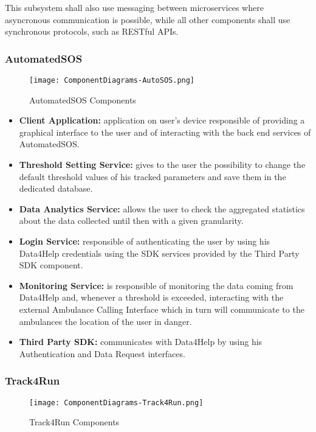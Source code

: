 This subsystem shall also use messaging between microservices where asyncronous communication is possible, while all other components shall use synchronous protocols, such as RESTful APIs.

\subsubsection{AutomatedSOS}

\FloatBarrier
\begin{figure}[!h]
	\centering
	\texttt{[image: ComponentDiagrams-AutoSOS.png]}
	\caption{AutomatedSOS Components}
\end{figure}
\FloatBarrier

\begin{itemize}
	\item \textbf{Client Application:} application on user's device responsible of providing a graphical interface to the user and of interacting with the back end  services of AutomatedSOS.
	\item \textbf{Threshold Setting Service:} gives to the user the possibility to change the default threshold values of his tracked parameters and save them in the dedicated database. 
	\item \textbf{Data Analytics Service:} allows the user to check the aggregated statistics about the data collected until then with a given granularity. 
	\item \textbf{Login Service:} responsible of authenticating the user by using his Data4Help credentials using the SDK services provided by the Third Party SDK component.
	\item \textbf{Monitoring Service:} is responsible of monitoring the data coming from Data4Help and, whenever a threshold is exceeded, interacting with the external Ambulance Calling Interface which in turn will communicate to the ambulances the location of the user in danger.
	\item \textbf{Third Party SDK:} communicates with Data4Help by using his Authentication and Data Request interfaces.
\end{itemize}


\subsubsection{Track4Run}

\FloatBarrier
\begin{figure}[!h]
	\centering
	\texttt{[image: ComponentDiagrams-Track4Run.png]}
	\caption{Track4Run Components}
\end{figure}
\FloatBarrier

